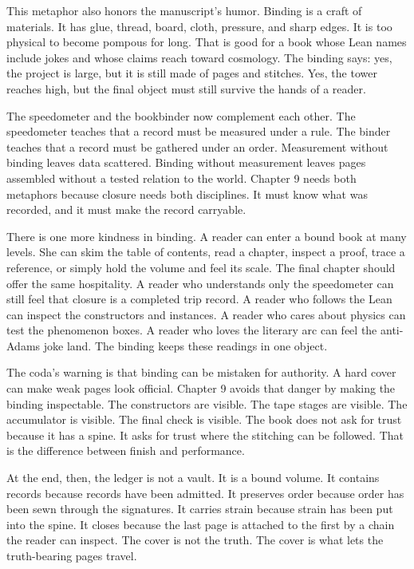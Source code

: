 This metaphor also honors the manuscript's humor. Binding is a craft of
materials. It has glue, thread, board, cloth, pressure, and sharp edges. It is
too physical to become pompous for long. That is good for a book whose Lean
names include jokes and whose claims reach toward cosmology. The binding says:
yes, the project is large, but it is still made of pages and stitches. Yes,
the tower reaches high, but the final object must still survive the hands of a
reader.

The speedometer and the bookbinder now complement each other. The speedometer
teaches that a record must be measured under a rule. The binder teaches that a
record must be gathered under an order. Measurement without binding leaves
data scattered. Binding without measurement leaves pages assembled without a
tested relation to the world. Chapter 9 needs both metaphors because closure
needs both disciplines. It must know what was recorded, and it must make the
record carryable.

There is one more kindness in binding. A reader can enter a bound book at many
levels. She can skim the table of contents, read a chapter, inspect a proof,
trace a reference, or simply hold the volume and feel its scale. The final
chapter should offer the same hospitality. A reader who understands only the
speedometer can still feel that closure is a completed trip record. A reader
who follows the Lean can inspect the constructors and instances. A reader who
cares about physics can test the phenomenon boxes. A reader who loves the
literary arc can feel the anti-Adams joke land. The binding keeps these
readings in one object.

The coda's warning is that binding can be mistaken for authority. A hard cover
can make weak pages look official. Chapter 9 avoids that danger by making the
binding inspectable. The constructors are visible. The tape stages are visible.
The accumulator is visible. The final check is visible. The book does not ask
for trust because it has a spine. It asks for trust where the stitching can be
followed. That is the difference between finish and performance.

At the end, then, the ledger is not a vault. It is a bound volume. It contains
records because records have been admitted. It preserves order because order
has been sewn through the signatures. It carries strain because strain has
been put into the spine. It closes because the last page is attached to the
first by a chain the reader can inspect. The cover is not the truth. The
cover is what lets the truth-bearing pages travel.

